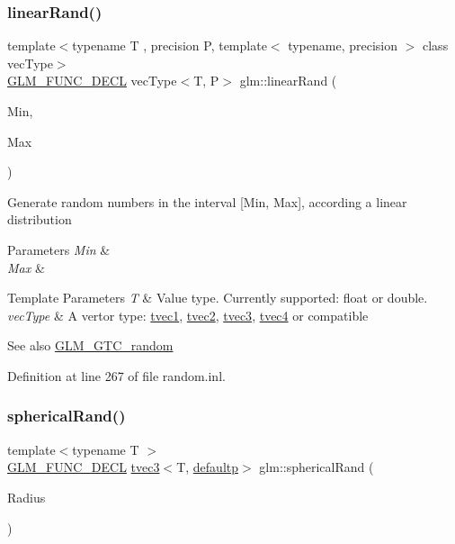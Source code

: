 \subsubsection{\texorpdfstring{linearRand()}{linearRand()}\hspace{0.1cm}{\footnotesize\ttfamily [2/2]}}
{\footnotesize\ttfamily template$<$typename T , precision P, template$<$ typename, precision $>$ class vec\+Type$>$ \\
\mbox{\hyperlink{setup_8hpp_ab2d052de21a70539923e9bcbf6e83a51}{G\+L\+M\+\_\+\+F\+U\+N\+C\+\_\+\+D\+E\+CL}} vec\+Type$<$T, P$>$ glm\+::linear\+Rand (\begin{DoxyParamCaption}\item[{vec\+Type$<$ T, P $>$ const \&}]{Min,  }\item[{vec\+Type$<$ T, P $>$ const \&}]{Max }\end{DoxyParamCaption})}

Generate random numbers in the interval \mbox{[}Min, Max\mbox{]}, according a linear distribution


\begin{DoxyParams}{Parameters}
{\em Min} & \\
\hline
{\em Max} & \\
\hline
\end{DoxyParams}

\begin{DoxyTemplParams}{Template Parameters}
{\em T} & Value type. Currently supported\+: float or double. \\
\hline
{\em vec\+Type} & A vertor type\+: \mbox{\hyperlink{structglm_1_1tvec1}{tvec1}}, \mbox{\hyperlink{structglm_1_1tvec2}{tvec2}}, \mbox{\hyperlink{structglm_1_1tvec3}{tvec3}}, \mbox{\hyperlink{structglm_1_1tvec4}{tvec4}} or compatible \\
\hline
\end{DoxyTemplParams}
\begin{DoxySeeAlso}{See also}
\mbox{\hyperlink{group__gtc__random}{G\+L\+M\+\_\+\+G\+T\+C\+\_\+random}} 
\end{DoxySeeAlso}


Definition at line 267 of file random.\+inl.

\mbox{\label{group__gtc__random_gaa9a6fc2d7a295b3857f7db23b1053d9d}} 
\subsubsection{\texorpdfstring{sphericalRand()}{sphericalRand()}}
{\footnotesize\ttfamily template$<$typename T $>$ \\
\mbox{\hyperlink{setup_8hpp_ab2d052de21a70539923e9bcbf6e83a51}{G\+L\+M\+\_\+\+F\+U\+N\+C\+\_\+\+D\+E\+CL}} \mbox{\hyperlink{structglm_1_1tvec3}{tvec3}}$<$T, \mbox{\hyperlink{namespaceglm_a0f04f086094c747d227af4425893f545a9d21ccd8b5a009ec7eb7677befc3bf51}{defaultp}}$>$ glm\+::spherical\+Rand (\begin{DoxyParamCaption}\item[{T}]{Radius }\end{DoxyParamCaption})}

